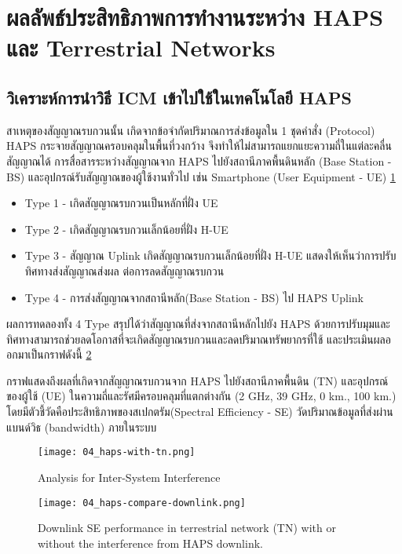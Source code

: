 \section{ผลลัพธ์ประสิทธิภาพการทำงานระหว่าง HAPS และ Terrestrial Networks}

\subsection{วิเคราะห์การนำวิธี ICM เข้าไปใช้ในเทคโนโลยี HAPS}

\begin{multicols}{2}
สาเหตุของสัญญาณรบกวนนั้น เกิดจากข้อจำกัดปริมาณการส่งข้อมูลใน 1 ชุดคำสั่ง (Protocol)
HAPS กระจายสัญญาณครอบคลุมในพื้นที่วงกว้าง จึงทำให้ไม่สามารถแยกแยะความถี่ในแต่ละคลื่นสัญญาณได้
การสื่อสารระหว่างสัญญาณจาก HAPS ไปยังสถานีภาคพื้นดินหลัก (Base Station - BS)
และอุปกรณ์รับสัญญาณของผู้ใช้งานทั่วไป เช่น Smartphone (User Equipment - UE) \ref{fig:04-haps-with-tn}

\begin{itemize}
    \item Type 1 - เกิดสัญญาณรบกวนเป็นหลักที่ฝั่ง UE
    \item Type 2 - เกิดสัญญาณรบกวนเล็กน้อยที่ฝั่ง H-UE
    \item Type 3 - สัญญาณ Uplink เกิดสัญญาณรบกวนเล็กน้อยที่ฝั่ง H-UE แสดงให้เห็นว่าการปรับทิศทางส่งสัญญาณส่งผล
    ต่อการลดสัญญาณรบกวน
    \item Type 4 - การส่งสัญญาณจากสถานีหลัก(Base Station - BS) ไป HAPS Uplink
\end{itemize}

ผลการทดลองทั้ง 4 Type สรุปได้ว่าสัญญาณที่ส่งจากสถานีหลักไปยัง HAPS ด้วยการปรับมุมและทิศทางสามารถช่วยลดโอกาสที่จะเกิดสัญญาณรบกวนและลดปริมาณทรัพยากรที่ใช้ และประเมินผลออกมาเป็นกราฟดังนี้
\ref{fig:04-haps-compare-downlink}

กราฟแสดงถึงผลที่เกิดจากสัญญาณรบกวนจาก HAPS ไปยังสถานีภาคพื้นดิน (TN) และอุปกรณ์ของผู้ใช้ (UE)
ในความถี่และรัศมีครอบคลุมที่แตกต่างกัน (2 GHz, 39 GHz, 0 km., 100 km.) โดยมีตัวชี้วัดคือประสิทธิภาพของสเปกตรัม(Spectral Efficiency - SE)
วัดปริมาณข้อมูลที่ส่งผ่านแบนด์วิธ (bandwidth) ภายในระบบ

\columnbreak


\begin{figure}[H]
\centering
\texttt{[image: 04\_haps-with-tn.png]}
\caption[Interference Type]{Analysis for Inter-System Interference} \label{fig:04-haps-with-tn} 
\end{figure}

\begin{figure}[H]
\centering
\texttt{[image: 04\_haps-compare-downlink.png]}
\caption[HAPS compare with downlink]{Downlink SE performance in terrestrial network (TN) with or without
the interference from HAPS downlink.} \label{fig:04-haps-compare-downlink}
\end{figure}
\end{multicols}

